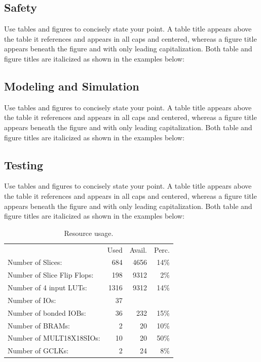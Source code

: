 \documentclass[12pt, letterpaper]{article}
\begin{document}
\subsection{Safety}
Use tables and figures to concisely state your point. A table title appears above the table it references and appears in all caps and centered, whereas a figure title appears beneath the figure and with only leading capitalization. Both table and figure titles are italicized as shown in the examples below:

\subsection{Modeling and Simulation}
Use tables and figures to concisely state your point. A table title appears above the table it references and appears in all caps and centered, whereas a figure title appears beneath the figure and with only leading capitalization. Both table and figure titles are italicized as shown in the examples below:

\subsection{Testing}
Use tables and figures to concisely state your point. A table title appears above the table it references and appears in all caps and centered, whereas a figure title appears beneath the figure and with only leading capitalization. Both table and figure titles are italicized as shown in the examples below:

\begin{table}[h]
\centering
\begin{tabular}{l  r  r  r}
                                       & Used  & Avail. & Perc. \\
  Number of Slices:                    &  684  & 4656  &  14\%  \\
  Number of Slice Flip Flops:          &  198  & 9312  &   2\%  \\
  Number of 4 input LUTs:              & 1316  & 9312  &  14\%  \\
  Number of IOs:                       &   37  &       &      \\
  Number of bonded IOBs:               &   36  &  232  &  15\%  \\
  Number of BRAMs:                     &    2  &   20  &  10\%  \\
  Number of MULT18X18SIOs:             &   10  &   20  &  50\%  \\
  Number of GCLKs:                     &    2  &   24  &   8\%  \\
\end{tabular}
\caption{Resource usage.}
\label{tab:usage}
\end{table}
\end{document}
